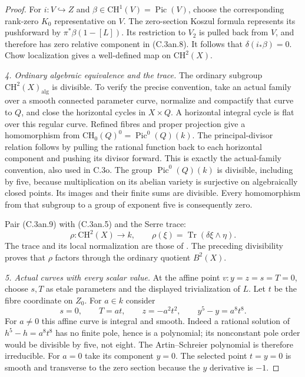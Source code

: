\begin{proof}
For $i:V\hookrightarrow Z$ and
$\beta\in\mathrm{CH}^1(V)=\operatorname{Pic}(V)$, choose
the corresponding rank-zero $K_0$ representative on $V$.
The zero-section Koszul formula represents its pushforward
by $\pi^*\beta(1-[L])$. Its restriction to $V_2$ is
pulled back from $V$, and therefore has zero relative
component in (C.3an.8). It follows that $\delta(i_*\beta)=0$.
Chow localization gives a well-defined map on
$\mathrm{CH}^2(X)$.

\emph{4. Ordinary algebraic equivalence and the trace.}
The ordinary subgroup $\mathrm{CH}^2(X)_{\mathrm{alg}}$
is divisible. To verify the precise convention, take an
actual family over a smooth connected parameter curve,
normalize and compactify that curve to $Q$, and close
the horizontal cycles in $X\times Q$. A horizontal
integral cycle is flat over this regular curve. Refined
fibres and proper projection give a homomorphism from
$\mathrm{CH}_0(Q)^0=\operatorname{Pic}^0(Q)(k)$.
The principal-divisor relation follows by pulling the
rational function back to each horizontal component
and pushing its divisor forward. This is exactly the
actual-family convention, also used in C.3o.
The group $\operatorname{Pic}^0(Q)(k)$ is divisible,
including by five, because multiplication on its
abelian variety is surjective on algebraically closed
points. Its images and their finite sums are divisible.
Every homomorphism from that subgroup to a group of
exponent five is consequently zero.

Pair (C.3an.9) with (C.3an.5) and the Serre trace:
\[
 \rho:\mathrm{CH}^2(X)\longrightarrow k,
       \qquad \rho(\xi)=\operatorname{Tr}(\delta\xi\wedge\eta).
                                                        \tag{C.3an.10}
\]
The trace and its local normalization are those of
\citet[Section~48.27, especially Lemma~48.27.1 and
Remarks~48.27.2--3,6, Tag 0FVU]{D_Stacks0FVU}.
The preceding divisibility proves that $\rho$ factors
through the ordinary quotient $B^2(X)$.

\emph{5. Actual curves with every scalar value.}
At the affine point $v:y=z=s=T=0$, choose $s,T$ as
etale parameters and the displayed trivialization of $L$.
Let $t$ be the fibre coordinate on $Z_0$. For $a\in k$
consider
\[
 s=0,\qquad T=at,\qquad z=-a^2t^2,\qquad
                         y^5-y=a^8t^8.
                                                        \tag{C.3an.11}
\]
For $a\ne0$ this affine curve is integral and smooth.
Indeed a rational solution of $h^5-h=a^8t^8$ has no
finite pole, hence is a polynomial; its nonconstant
pole order would be divisible by five, not eight.
The Artin--Schreier polynomial is therefore irreducible.
For $a=0$ take its component $y=0$.
The selected point $t=y=0$ is smooth and transverse
to the zero section because the $y$ derivative is $-1$.


\end{proof}

